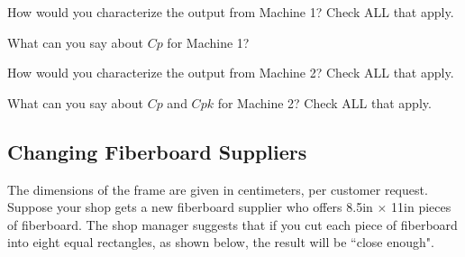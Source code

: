 \documentclass{ximera}
\begin{document}
\begin{question}\label{quest:Mach1Mach2}
How would you characterize the output from Machine 1? Check ALL that apply.

\begin{selectAll}
\end{selectAll}

What can you say about $Cp$ for Machine 1?

\begin{selectAll}
\end{selectAll}

How would you characterize the output from Machine 2? Check ALL that apply.

\begin{selectAll}
\end{selectAll}

What can you say about $Cp$ and $Cpk$ for Machine 2?  Check ALL that apply.

\begin{selectAll}
\end{selectAll}
\end{question}

\subsection*{Changing Fiberboard Suppliers}

The dimensions of the frame are given in centimeters, per customer request. Suppose your shop gets a new fiberboard supplier who offers 8.5in $\times$ 11in pieces of fiberboard.  The shop manager suggests that if you cut each piece of fiberboard into eight equal rectangles, as shown below, the result will be ``close enough".
\end{document}
